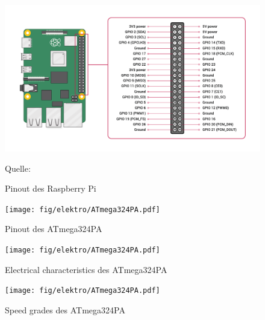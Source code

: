 \begin{figure}[htb]
    \includegraphics[scale=0.25]{fig/elektro/GPIO-Pinout-Diagram.png}
    {\par\raggedleft\footnotesize \tiny Quelle: }
    \caption{Pinout des Raspberry Pi}
\end{figure}

\begin{figure}[hb]
    \centering
    \texttt{[image: fig/elektro/ATmega324PA.pdf]}
    \caption{Pinout des ATmega324PA}
\end{figure}

\begin{figure}[hb]
    \centering
    \texttt{[image: fig/elektro/ATmega324PA.pdf]}
    \caption{Electrical characteristics des ATmega324PA}
\end{figure}

\begin{figure}[hb]
    \centering
    \texttt{[image: fig/elektro/ATmega324PA.pdf]}
    \caption{Speed grades des ATmega324PA}
\end{figure}

